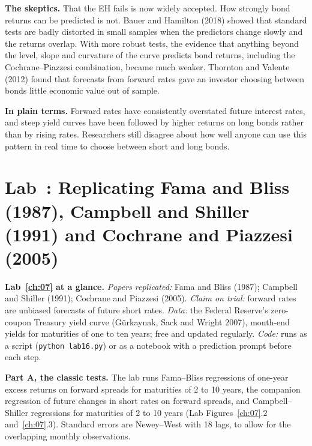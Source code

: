 \textbf{The skeptics.} That the EH fails is now widely accepted. How strongly bond returns can be predicted is not. Bauer and Hamilton (2018) showed that standard tests are badly distorted in small samples when the predictors change slowly and the returns overlap. With more robust tests, the evidence that anything beyond the level, slope and curvature of the curve predicts bond returns, including the Cochrane--Piazzesi combination, became much weaker. Thornton and Valente (2012) found that forecasts from forward rates gave an investor choosing between bonds little economic value out of sample.

\noindent\textbf{In plain terms.} Forward rates have consistently overstated future interest rates, and steep yield curves have been followed by higher returns on long bonds rather than by rising rates. Researchers still disagree about how well anyone can use this pattern in real time to choose between short and long bonds.

\section{Lab~\thechapter: Replicating Fama and Bliss (1987), Campbell and Shiller (1991) and Cochrane and Piazzesi (2005)}
\label{sec:07-lab}

\begin{callout}
\textbf{Lab~\ref{ch:07} at a glance.} \emph{Papers replicated:} Fama and Bliss (1987); Campbell and Shiller (1991); Cochrane and Piazzesi (2005). \emph{Claim on trial:} forward rates are unbiased forecasts of future short rates. \emph{Data:} the Federal Reserve's zero-coupon Treasury yield curve (G\"urkaynak, Sack and Wright 2007), month-end yields for maturities of one to ten years; free and updated regularly. \emph{Code:} runs as a script (\texttt{python lab16.py}) or as a notebook with a prediction prompt before each step.
\end{callout}

\textbf{Part A, the classic tests.} The lab runs Fama--Bliss regressions of one-year excess returns on forward spreads for maturities of 2 to 10 years, the companion regression of future changes in short rates on forward spreads, and Campbell--Shiller regressions for maturities of 2 to 10 years (Lab Figures~\ref{ch:07}.2 and~\ref{ch:07}.3). Standard errors are Newey--West with 18 lags, to allow for the overlapping monthly observations.

